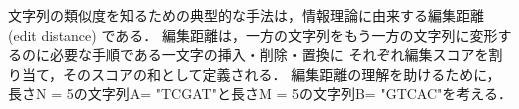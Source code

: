文字列の類似度を知るための典型的な手法は，情報理論に由来する編集距離 (edit distance) である．
編集距離は，一方の文字列をもう一方の文字列に変形するのに必要な手順である一文字の挿入・削除・置換に
それぞれ編集スコアを割り当て，そのスコアの和として定義される．
編集距離の理解を助けるために，長さN = 5の文字列A= "TCGAT"と長さM = 5の文字列B= "GTCAC"を考える．
\begin{figure}[ht!]
    \begin{center}
        \\
    \\
    \\
    \\
     \subfigure[]{
}
\end{center}
\end{figure}
